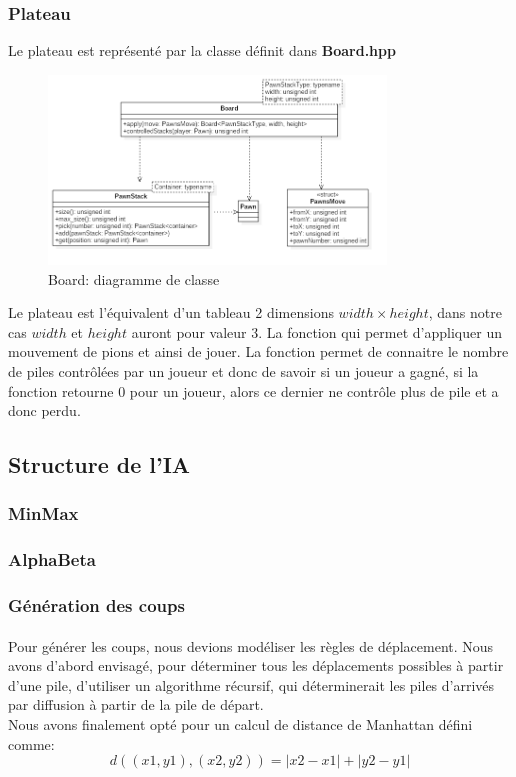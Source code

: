 \documentclass[article, backcover, french, nodocumentinfo]{upmethodology-document}
\begin{document}
			\subsubsection{Plateau}
					Le plateau est représenté par la classe  définit dans \textbf{Board.hpp}
					\begin{figure}[H]
						\centering
						\includegraphics[width=0.8\textwidth]{figures/BoardDiagram}
						\caption{Board: diagramme de classe}
						\label{fig:BoardDiagram}
					\end{figure}
					Le plateau est l'équivalent d'un tableau 2 dimensions $width \times height$, dans notre cas $width$ et $height$ auront pour valeur 3.
					La fonction  qui permet d'appliquer un mouvement de pions et ainsi de jouer. La fonction  permet de connaitre le nombre de piles contrôlées par un joueur et donc de savoir si un joueur a gagné, si la fonction retourne 0 pour un joueur, alors ce dernier ne contrôle plus de pile et a donc perdu.
		\subsection{Structure de l'IA}
			\subsubsection{MinMax}
			\subsubsection{AlphaBeta}
			\subsubsection{Génération des coups}
				\paragraph{}
					Pour générer les coups, nous devions modéliser les règles de déplacement. Nous avons d'abord envisagé, pour déterminer tous les déplacements possibles à partir d'une pile, d'utiliser un algorithme récursif, qui déterminerait les piles d'arrivés par diffusion à partir de la pile de départ.\\
					Nous avons finalement opté pour un calcul de distance de Manhattan défini comme:
					\[d((x1,y1),(x2,y2)) = |x2 - x1| + |y2 -y1|\]
\end{document}
